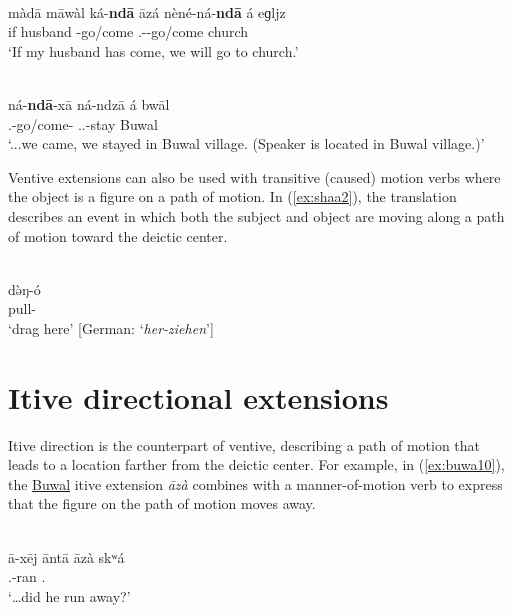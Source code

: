 \ea\label{ex:buwa1}
 \\
\gll  màdā māwàl ká-\textbf{ndā} āzá nèné-ná-\textbf{ndā} á eɡljz \\
if husband -go/come  .--go/come  church \\
\glt `If my husband has come, we will go to church.'

\ex\label{ex:buwa100}
 \\
\gll ná-\textbf{ndā}-xā ná-ndzā á bwāl \\
.-go/come- ..-stay  Buwal	\\
\glt `...we came, we stayed in Buwal village. (Speaker is located in Buwal village.)'
\z

Ventive extensions can also be used with transitive (caused) motion verbs where the object is a figure on a path of motion. In (\ref{ex:shaa2}), the translation describes an event in which both the subject and object are moving along a path of motion toward the deictic center.

\ea\label{ex:shaa2}
 \\
\gll də̀ŋ-ó \\
pull- \\
\glt `drag here' [German: `\textit{her-ziehen}']
\z 

\section{Itive directional extensions} \label{sec:itive1}

Itive direction is the counterpart of ventive, describing a path of motion that leads to a location farther from the deictic center. For example, in (\ref{ex:buwa10}), the \hyperref[buwa]{Buwal} itive extension \textit{āzà} combines with a manner-of-motion verb to express that the figure on the path of motion moves away. 

\ea\label{ex:buwa10}
 \\
\gll ā-xēj āntā āzà skʷá	\\
.-ran .  	\\
\glt `…did he run away?'	
\z

